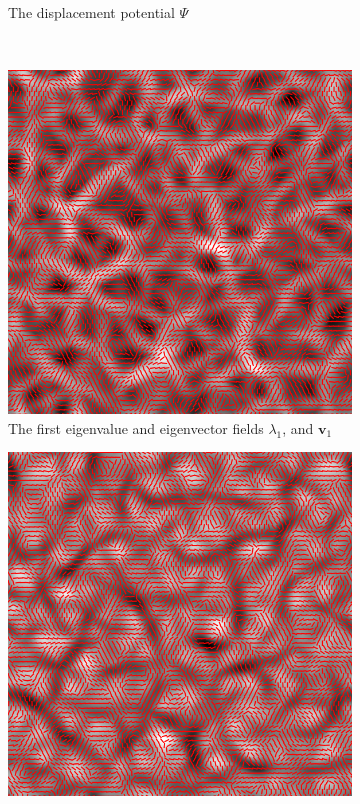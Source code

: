 \documentclass[a4paper, 11pt]{article}
\begin{document}
\begin{figure}
\begin{subfigure}[b]{0.49\textwidth}
\caption{The displacement potential $\Psi$}
\label{fig:Psi}
\end{subfigure}\\
\begin{subfigure}[b]{0.49\textwidth}
\includegraphics[width=\textwidth]{a}
\caption{The first eigenvalue and eigenvector fields $\lambda_1$, and $\bm{v}_1$}
\label{fig:lambda1}
\end{subfigure}
\begin{subfigure}[b]{0.49\textwidth}
\includegraphics[width=\textwidth]{b}

\end{subfigure}
\end{figure}
\end{document}
